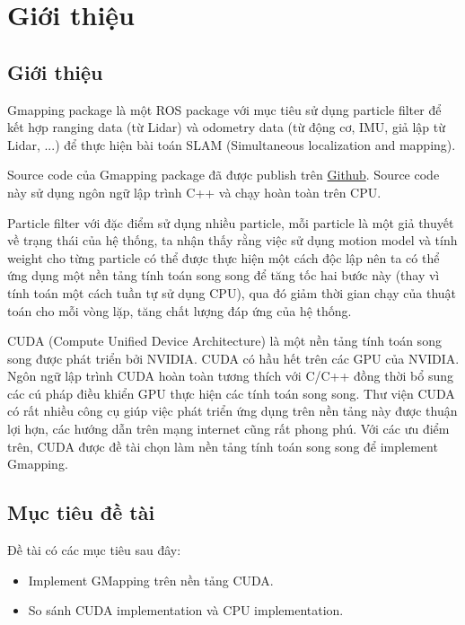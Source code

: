 \documentclass[../../main.tex]{subfiles}
\begin{document}
\chapter{Giới thiệu}

\section{Giới thiệu}
Gmapping package là một ROS package với mục tiêu sử dụng particle filter để kết hợp ranging data (từ Lidar) và odometry data (từ động cơ, IMU, giả lập từ Lidar, ...) để  thực hiện bài toán SLAM (Simultaneous localization and mapping).

Source code của Gmapping package đã được publish trên \href{https://github.com/ros-perception/slam_gmapping.}{Github}. Source code này sử dụng ngôn ngữ lập trình C++ và chạy hoàn toàn trên CPU.

Particle filter với đặc điểm sử dụng nhiều particle, mỗi particle là một giả thuyết về trạng thái của hệ thống, ta nhận thấy rằng việc sử dụng motion model và tính weight cho từng particle có thể được thực hiện một cách độc lập nên ta có thể ứng dụng một nền tảng tính toán song song để tăng tốc hai bước này (thay vì tính toán một cách tuần tự sử dụng CPU), qua đó giảm thời gian chạy của thuật toán cho mỗi vòng lặp, tăng chất lượng đáp ứng của hệ thống.

CUDA (Compute Unified Device Architecture) là một nền tảng tính toán song song được phát triển bởi NVIDIA. CUDA có hầu hết trên các GPU của NVIDIA. Ngôn ngữ lập trình CUDA hoàn toàn tương thích với C/C++ đồng thời bổ  sung các cú pháp điều khiển GPU thực hiện các tính toán song song. Thư viện CUDA có rất nhiều công cụ giúp việc phát triển ứng dụng trên nền tảng này được thuận lợi hợn, các hướng dẫn trên mạng internet cũng rất phong phú. Với các ưu điểm trên, CUDA được đề tài chọn làm nền tảng tính toán song song để implement Gmapping.

\section{Mục tiêu đề tài}
Đề tài có các mục tiêu sau đây:
\begin{itemize}
    \item Implement GMapping trên nền tảng CUDA.
    \item So sánh CUDA implementation và CPU implementation.
\end{itemize}
\end{document}
